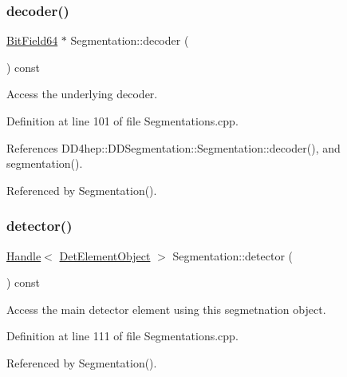 \subsubsection{\texorpdfstring{decoder()}{decoder()}}
{\footnotesize\ttfamily \hyperlink{class_d_d4hep_1_1_d_d_segmentation_1_1_bit_field64}{Bit\+Field64} $\ast$ Segmentation\+::decoder (\begin{DoxyParamCaption}{ }\end{DoxyParamCaption}) const}



Access the underlying decoder. 



Definition at line 101 of file Segmentations.\+cpp.



References D\+D4hep\+::\+D\+D\+Segmentation\+::\+Segmentation\+::decoder(), and segmentation().



Referenced by Segmentation().

\hypertarget{class_d_d4hep_1_1_geometry_1_1_segmentation_a7960b9b5d6233ee3e3e42893f3ea1d66}{}\label{class_d_d4hep_1_1_geometry_1_1_segmentation_a7960b9b5d6233ee3e3e42893f3ea1d66} 
\subsubsection{\texorpdfstring{detector()}{detector()}}
{\footnotesize\ttfamily \hyperlink{class_d_d4hep_1_1_handle}{Handle}$<$ \hyperlink{class_d_d4hep_1_1_geometry_1_1_det_element_object}{Det\+Element\+Object} $>$ Segmentation\+::detector (\begin{DoxyParamCaption}{ }\end{DoxyParamCaption}) const}



Access the main detector element using this segmetnation object. 



Definition at line 111 of file Segmentations.\+cpp.



Referenced by Segmentation().

\hypertarget{class_d_d4hep_1_1_geometry_1_1_segmentation_a2de3f25677347022a2741c7a203c8d6f}{}\label{class_d_d4hep_1_1_geometry_1_1_segmentation_a2de3f25677347022a2741c7a203c8d6f} 
